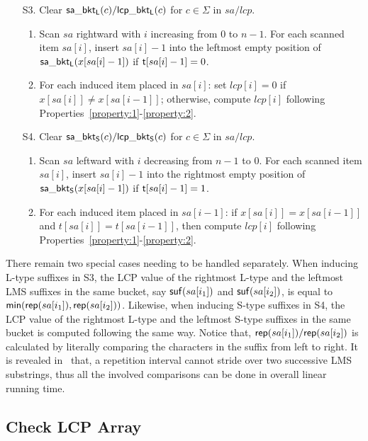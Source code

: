 \documentclass[10pt,journal,compsoc]{IEEEtran}
\begin{document}
	\begin{enumerate}
		\item [S3.] Clear ${\sf sa\_bkt_L}(c)/{\sf lcp\_bkt_L}(c)$ for $c \in \Sigma$ in $sa/lcp$.
		\begin{enumerate}[(1)]
			\item
			Scan $sa$ rightward with $i$ increasing from $0$ to $n - 1$. For each scanned item $sa[i]$, insert $sa[i] - 1$ into the leftmost empty position of ${\sf sa\_bkt_L}(x[sa[i] - 1])$ if ${\sf t}[sa[i] - 1] = 0$.
			\item
			For each induced item placed in $sa[i]$: set $lcp[i] = 0$ if $x[sa[i]] \ne x[sa[i - 1]]$; otherwise, compute $lcp[i]$ following Properties~\ref{property:1}-\ref{property:2}.
		\end{enumerate}
		
		\item [S4.] Clear ${\sf sa\_bkt_S}(c)/{\sf lcp\_bkt_S}(c)$ for $c \in \Sigma$ in $sa/lcp$.
		\begin{enumerate}[(1)]
			\item
			Scan $sa$ leftward with $i$ decreasing from $n - 1$ to $0$. For each scanned item $sa[i]$, insert $sa[i] - 1$ into the rightmost empty position of ${\sf sa\_bkt_S}(x[sa[i] - 1])$ if ${\sf t}[sa[i] - 1] = 1$.
			\item
			For each induced item placed in $sa[i - 1]$: if $x[sa[i]] = x[sa[i - 1]]$ and $t[sa[i]] = t[sa[i - 1]]$, then compute $lcp[i]$ following Properties~\ref{property:1}-\ref{property:2}.
		\end{enumerate}
		
	\end{enumerate}
	
	There remain two special cases needing to be handled separately. When inducing L-type suffixes in S3, the LCP value of the rightmost L-type and the leftmost LMS suffixes in the same bucket, say ${\sf suf}(sa[i_1])$ and ${\sf suf}(sa[i_2])$, is equal to ${\sf min}({\sf rep}(sa[i_1]), {\sf rep}(sa[i_2]))$. Likewise, when inducing S-type suffixes in S4, the LCP value of the rightmost L-type and the leftmost S-type suffixes in the same bucket is computed following the same way. Notice that, ${\sf rep}(sa[i_1])/{\sf rep}(sa[i_2])$ is calculated by literally comparing the characters in the suffix from left to right. It is revealed in~\cite{Fischer11} that, a repetition interval cannot stride over two successive LMS substrings, thus all the involved comparisons can be done in overall linear running time.
	
	\subsection{Check LCP Array} \label{sec:method2:check_lcp}
	
\end{document}
